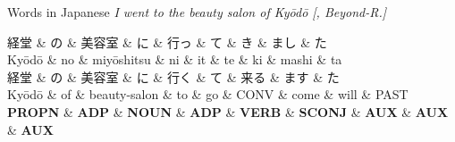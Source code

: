 \documentclass[10pt, compress, aspectratio=169]{beamer}
\newcommand{\upos}[1]{\textbf{\color{blue}#1}}
\newcommand{\zh}[1]{{\jafont #1}}
\begin{document}
\begin{frame}{Words in Japanese}
\textit{I went to the beauty salon of Kyōdō [, Beyond-R.]}

\begin{dependency}[label style={thick, font=\bfseries}]
\begin{deptext}[font=\bfseries]
\zh{経堂} \& \zh{の} \& \zh{美容室} \& \zh{に} \& \zh{行っ} \& \zh{て} \& \zh{き} \& \zh{まし} \& \zh{た} \\
Kyōdō \& no \& miyōshitsu \& ni \& it \& te \& ki \& mashi \& ta \\
\zh{経堂} \& \zh{の} \& \zh{美容室} \& \zh{に} \& \zh{行く} \& \zh{て} \& \zh{来る} \& \zh{ます} \& \zh{た} \\
Kyōdō \& of \& beauty-salon \& to \& go \& CONV \& come \& will \& PAST \\
\upos{PROPN} \& \upos{ADP} \& \upos{NOUN} \& \upos{ADP} \& \upos{VERB} \& \upos{SCONJ} \& \upos{AUX} \& \upos{AUX} \& \upos{AUX} \\
\end{deptext}
\end{dependency}
\end{frame}
\end{document}
